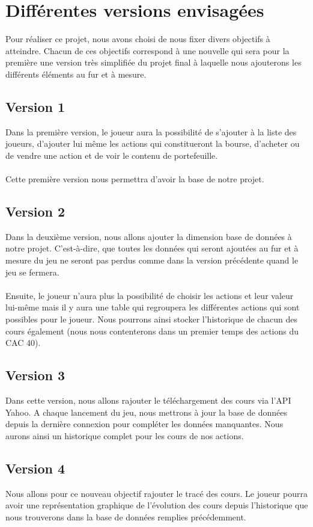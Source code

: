 \chapter{Différentes versions envisagées}
Pour réaliser ce projet, nous avons choisi de nous fixer divers objectifs à atteindre. Chacun de ces objectifs correspond à une nouvelle qui sera pour la première une version très simplifiée du projet final à laquelle nous ajouterons les différents éléments au fur et à mesure. \\ 
\section{Version 1}
Dans la première version, le joueur aura la possibilité de s'ajouter à la liste des joueurs, d'ajouter lui même les actions qui constitueront la bourse, d'acheter ou de vendre une action et de voir le contenu de portefeuille. \\ \\
Cette première version nous permettra d'avoir la base de notre projet. 

\section{Version 2}
Dans la deuxième version, nous allons ajouter la dimension base de données à notre projet. C'est-à-dire, que toutes les données qui seront ajoutées au fur et à mesure du jeu ne seront pas perdus comme dans la version précédente quand le jeu se fermera. \\ \\
Ensuite, le joueur n'aura plus la possibilité de choisir les actions et leur valeur lui-même mais il y aura une table qui regroupera les différentes actions qui sont possibles pour le joueur. Nous pourrons ainsi stocker l'historique de chacun des cours également (nous nous contenterons dans un premier temps des actions du CAC 40). 

\section{Version 3}
Dans cette version, nous allons rajouter le téléchargement des cours via l'API Yahoo. A chaque lancement du jeu, nous mettrons à jour la base de données depuis la dernière connexion pour compléter les données manquantes. Nous aurons ainsi un historique complet pour les cours de nos actions. 

\section{Version 4}
Nous allons pour ce nouveau objectif rajouter le tracé des cours. Le joueur pourra avoir une représentation graphique de l'évolution des cours depuis l'historique que nous trouverons dans la base de données remplies précédemment. 

